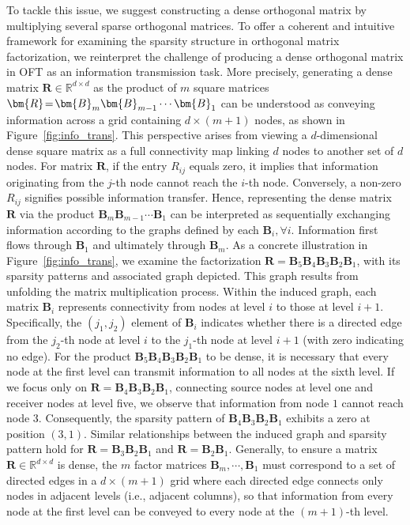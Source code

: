 To tackle this issue, we suggest constructing a dense orthogonal matrix by multiplying several sparse orthogonal matrices. To offer a coherent and intuitive framework for examining the sparsity structure in orthogonal matrix factorization, we reinterpret the challenge of producing a dense orthogonal matrix in OFT as an information transmission task. More precisely, generating a dense matrix $\bm{R}\in\mathbb{R}^{d\times d}$ as the product of $m$ square matrices $\thickmuskip=2mu \medmuskip=2mu \bm{R}=\bm{B}_m\bm{B}_{m-1}\cdots\bm{B}_1$ can be understood as conveying information across a grid containing $d\times (m+1)$ nodes, as shown in Figure~\ref{fig:info_trans}. This perspective arises from viewing a $d$-dimensional dense square matrix as a full connectivity map linking $d$ nodes to another set of $d$ nodes. For matrix $\bm{R}$, if the entry $R_{ij}$ equals zero, it implies that information originating from the $j$-th node cannot reach the $i$-th node. Conversely, a non-zero $R_{ij}$ signifies possible information transfer. Hence, representing the dense matrix $\bm{R}$ via the product $\bm{B}_m\bm{B}_{m-1}\cdots\bm{B}_1$ can be interpreted as sequentially exchanging information according to the graphs defined by each $\bm{B}_i, \forall i$. Information first flows through $\bm{B}_1$ and ultimately through $\bm{B}_m$. As a concrete illustration in Figure~\ref{fig:info_trans}, we examine the factorization $\bm{R}=\bm{B}_5\bm{B}_4\bm{B}_3\bm{B}_2\bm{B}_1$, with its sparsity patterns and associated graph depicted. This graph results from unfolding the matrix multiplication process. Within the induced graph, each matrix $\bm{B}_i$ represents connectivity from nodes at level $i$ to those at level $i+1$. Specifically, the $(j_1,j_2)$ element of $\bm{B}_i$ indicates whether there is a directed edge from the $j_2$-th node at level $i$ to the $j_1$-th node at level $i+1$ (with zero indicating no edge). For the product $\bm{B}_5\bm{B}_4\bm{B}_3\bm{B}_2\bm{B}_1$ to be dense, it is necessary that every node at the first level can transmit information to all nodes at the sixth level. If we focus only on $\bm{R}=\bm{B}_4\bm{B}_3\bm{B}_2\bm{B}_1$, connecting source nodes at level one and receiver nodes at level five, we observe that information from node $1$ cannot reach node $3$. Consequently, the sparsity pattern of $\bm{B}_4\bm{B}_3\bm{B}_2\bm{B}_1$ exhibits a zero at position $(3,1)$. Similar relationships between the induced graph and sparsity pattern hold for $\bm{R}=\bm{B}_3\bm{B}_2\bm{B}_1$ and $\bm{R}=\bm{B}_2\bm{B}_1$. Generally, to ensure a matrix $\bm{R}\in\mathbb{R}^{d\times d}$ is dense, the $m$ factor matrices $\bm{B}_m,\cdots,\bm{B}_1$ must correspond to a set of directed edges in a $d\times (m+1)$ grid where each directed edge connects only nodes in adjacent levels (i.e., adjacent columns), so that information from every node at the first level can be conveyed to every node at the $(m+1)$-th level.


